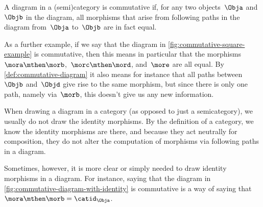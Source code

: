 \begin{marginfigure}
    \centering
    \caption{}
    \label{fig:commutative-diagram-example-prep}
\end{marginfigure}

\begin{marginfigure}
    \centering
    \caption{}
    \label{fig:commutative-diagram-example}
\end{marginfigure}

\begin{marginfigure}
    \centering
    \caption{}
    \label{fig:commutative-square-example}
\end{marginfigure}

\begin{marginfigure}
    \centering
    \caption{}
    \label{fig:commutative-diagram-with-identity}
\end{marginfigure}

\begin{definition}
    \label{def:commutative-diagram}
    A diagram in a (semi)category is commutative if, for any two objects~$\Obja$ and~$\Objb$ in the diagram, all morphisms that arise from following paths in the diagram from~$\Obja$ to~$\Objb$ are in fact equal.
\end{definition}

As a further example, if we say that the diagram in \cref{fig:commutative-square-example} is commutative, then this means in particular that the morphisms~$\mora \mthen \morb$,~$\morc \mthen \mord$, and~$\more$ are all equal.
By \cref{def:commutative-diagram} it also means for instance that all paths between~$\Objb$ and~$\Objd$ give rise to the same morphism, but since there is only one path, namely via~$\morb$, this doesn't give us any new information.

\begin{remark}
    When drawing a diagram in a category (as opposed to just a semicategory), we usually do not draw the identity morphisms.
    By the definition of a category, we know the identity morphisms are there, and because they act neutrally for composition, they do not alter the computation of morphisms via following paths in a diagram.

    Sometimes, however, it is more clear or simply needed to draw identity morphisms in a diagram.
    For instance, saying that the diagram in \cref{fig:commutative-diagram-with-identity} is commutative is a way of saying that~$\mora \mthen \morb = \catid_{\Obja}$.
\end{remark}

